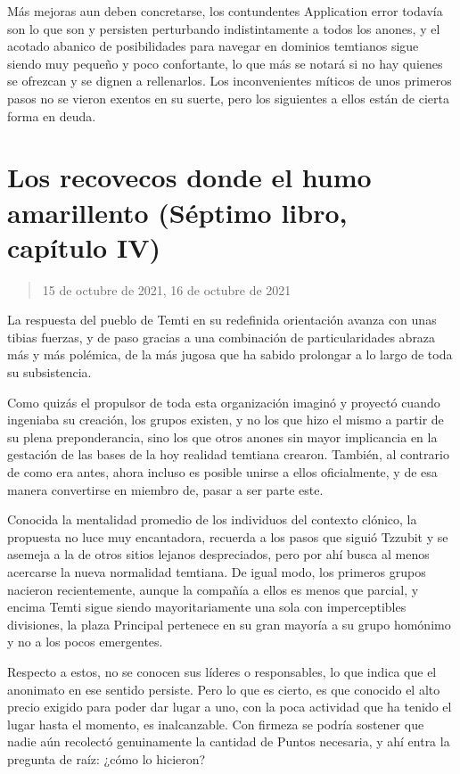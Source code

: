 \documentclass[
  spanish,
]{book}
\begin{document}
Más mejoras aun deben concretarse, los contundentes Application error todavía son lo que son y persisten perturbando indistintamente a todos los anones, y el acotado abanico de posibilidades para navegar en dominios temtianos sigue siendo muy pequeño y poco confortante, lo que más se notará si no hay quienes se ofrezcan y se dignen a rellenarlos. Los inconvenientes míticos de unos primeros pasos no se vieron exentos en su suerte, pero los siguientes a ellos están de cierta forma en deuda.

\hypertarget{los-recovecos-donde-el-humo-amarillento-suxe9ptimo-libro-capuxedtulo-iv}{%
\section{Los recovecos donde el humo amarillento (Séptimo libro, capítulo IV)}\label{los-recovecos-donde-el-humo-amarillento-suxe9ptimo-libro-capuxedtulo-iv}}

\begin{quote}
15 de octubre de 2021, 16 de octubre de 2021
\end{quote}

La respuesta del pueblo de Temti en su redefinida orientación avanza con unas tibias fuerzas, y de paso gracias a una combinación de particularidades abraza más y más polémica, de la más jugosa que ha sabido prolongar a lo largo de toda su subsistencia.

Como quizás el propulsor de toda esta organización imaginó y proyectó cuando ingeniaba su creación, los grupos existen, y no los que hizo el mismo a partir de su plena preponderancia, sino los que otros anones sin mayor implicancia en la gestación de las bases de la hoy realidad temtiana crearon. También, al contrario de como era antes, ahora incluso es posible unirse a ellos oficialmente, y de esa manera convertirse en miembro de, pasar a ser parte este.

Conocida la mentalidad promedio de los individuos del contexto clónico, la propuesta no luce muy encantadora, recuerda a los pasos que siguió Tzzubit y se asemeja a la de otros sitios lejanos despreciados, pero por ahí busca al menos acercarse la nueva normalidad temtiana. De igual modo, los primeros grupos nacieron recientemente, aunque la compañía a ellos es menos que parcial, y encima Temti sigue siendo mayoritariamente una sola con imperceptibles divisiones, la plaza Principal pertenece en su gran mayoría a su grupo homónimo y no a los pocos emergentes.

Respecto a estos, no se conocen sus líderes o responsables, lo que indica que el anonimato en ese sentido persiste. Pero lo que es cierto, es que conocido el alto precio exigido para poder dar lugar a uno, con la poca actividad que ha tenido el lugar hasta el momento, es inalcanzable. Con firmeza se podría sostener que nadie aún recolectó genuinamente la cantidad de Puntos necesaria, y ahí entra la pregunta de raíz: ¿cómo lo hicieron?
\end{document}
